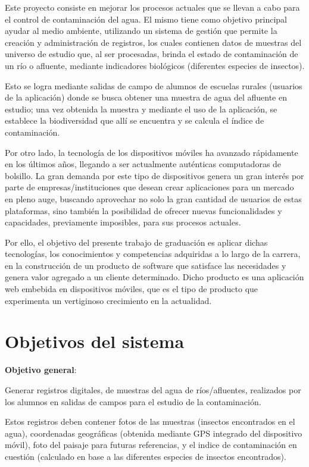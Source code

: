 Este proyecto consiste en mejorar los procesos actuales que se llevan a cabo para el control de contaminación del agua. El mismo tiene como objetivo principal ayudar al medio ambiente, utilizando un sistema de gestión que permite la creación y administración de registros, los cuales contienen datos de muestras del universo de estudio que, al ser procesadas, brinda el estado de contaminación de un río o afluente, mediante indicadores biológicos (diferentes especies de insectos). 
 
Esto se logra mediante salidas de campo de alumnos de escuelas rurales (usuarios de la aplicación) donde se busca obtener una muestra de agua del afluente en estudio; una vez obtenida la muestra y mediante el uso de la aplicación, se establece la biodiversidad que allí se encuentra y se calcula el índice de contaminación.

Por otro lado, la tecnología de los dispositivos móviles ha avanzado rápidamente en los últimos años, llegando a ser actualmente auténticas computadoras de bolsillo. La gran demanda por este tipo de dispositivos genera un gran interés por parte de empresas/instituciones que desean crear aplicaciones para un mercado en pleno auge, buscando aprovechar no solo la gran cantidad de usuarios de estas plataformas, sino también la posibilidad de ofrecer nuevas funcionalidades y capacidades, previamente imposibles, para sus procesos actuales.

Por ello, el objetivo del presente trabajo de graduación es aplicar dichas tecnologías, los conocimientos y competencias adquiridas a lo largo de la carrera, en la construcción de un producto de software que satisface las necesidades y genera valor agregado a un cliente determinado. Dicho producto es una aplicación web embebida en dispositivos móviles, que es el tipo de producto que experimenta un vertiginoso crecimiento en la actualidad.  \newpage


\section{Objetivos del sistema}

\textbf{Objetivo general}:
\newline

Generar registros digitales, de muestras del agua de ríos/afluentes, realizados por los alumnos en salidas de campos para el estudio de la contaminación.

Estos registros deben contener fotos de las muestras (insectos encontrados en el agua), coordenadas geográficas (obtenida mediante GPS integrado del dispositivo móvil), foto del paisaje para futuras referencias, y el indice de contaminación en cuestión (calculado en base a las diferentes especies de insectos encontrados).
\newline

